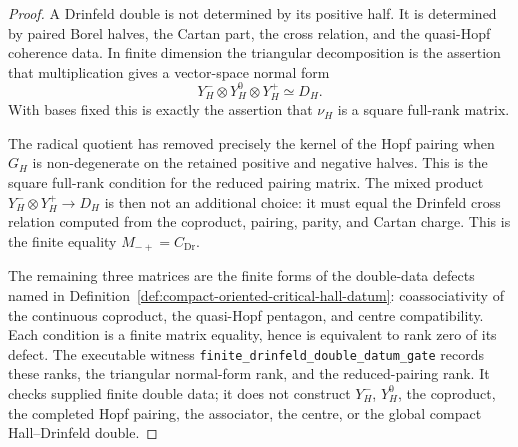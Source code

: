 \begin{proof}
A Drinfeld double is not determined by its positive half. It is
determined by paired Borel halves, the Cartan part, the cross relation,
and the quasi-Hopf coherence data. In finite dimension the triangular
decomposition is the assertion that multiplication gives a vector-space
normal form
\[
 Y_H^-\otimes Y_H^0\otimes Y_H^+\simeq D_H.
\]
With bases fixed this is exactly the assertion that \(\nu_H\) is a
square full-rank matrix.

The radical quotient has removed precisely the kernel of the Hopf
pairing when \(G_H\) is non-degenerate on the retained positive and
negative halves. This is the square full-rank condition for the reduced
pairing matrix. The mixed product \(Y_H^-\otimes Y_H^+\to D_H\) is then
not an additional choice: it must equal the Drinfeld cross relation
computed from the coproduct, pairing, parity, and Cartan charge. This
is the finite equality \(M_{-+}=C_{\mathrm{Dr}}\).

The remaining three matrices are the finite forms of the double-data
defects named in Definition~\ref{def:compact-oriented-critical-hall-datum}:
coassociativity of the continuous coproduct, the quasi-Hopf pentagon,
and centre compatibility. Each condition is a finite matrix equality,
hence is equivalent to rank zero of its defect. The executable witness
\texttt{finite\_drinfeld\_double\_datum\_gate} records these ranks,
the triangular normal-form rank, and the reduced-pairing rank. It checks
supplied finite double data; it does not construct \(Y_H^-\), \(Y_H^0\),
the coproduct, the completed Hopf pairing, the associator, the centre,
or the global compact Hall--Drinfeld double.
\end{proof}

